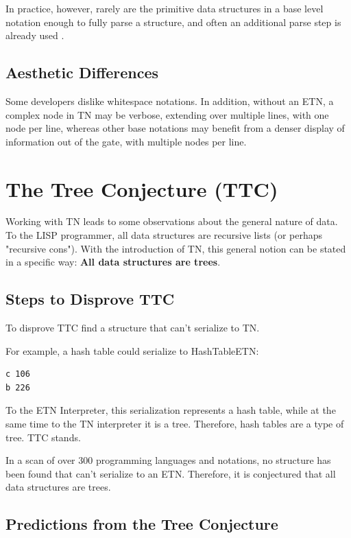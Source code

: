 \documentclass[journal]{IEEEtran}
\begin{document}
In practice, however, rarely are the primitive data structures in a base level notation enough to fully parse a structure, and often an additional parse step is already used \cite{Ooms}.

\subsection{Aesthetic Differences}

Some developers dislike whitespace notations. In addition, without an ETN, a complex node in TN may be verbose, extending over multiple lines, with one node per line, whereas other base notations may benefit from a denser display of information out of the gate, with multiple nodes per line.

\section{The Tree Conjecture (TTC)}

Working with TN leads to some observations about the general nature of data. To the LISP programmer, all data structures are recursive lists (or perhaps "recursive cons"). With the introduction of TN, this general notion can be stated in a specific way: \textbf{All data structures are trees}.

\subsection{Steps to Disprove TTC}

To disprove TTC find a structure that can't serialize to TN.

For example, a hash table could serialize to HashTableETN:

\begin{lstlisting}
c 106
b 226
\end{lstlisting}

To the ETN Interpreter, this serialization represents a hash table, while at the same time to the TN interpreter it is a tree. Therefore, hash tables are a type of tree. TTC stands.

In a scan of over 300 programming languages and notations, no structure has been found that can't serialize to an ETN. Therefore, it is conjectured that all data structures are trees.

\subsection{Predictions from the Tree Conjecture}
\end{document}
